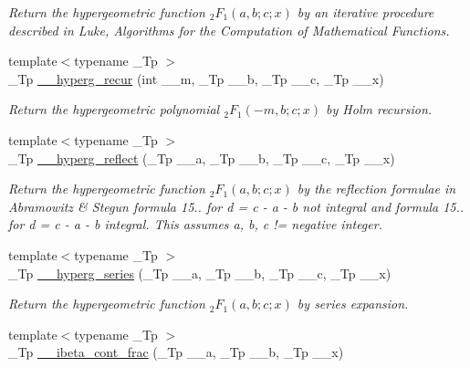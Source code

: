\begin{DoxyCompactItemize}
\begin{DoxyCompactList}\small\item\em Return the hypergeometric function $ {}_2F_1(a,b;c;x) $ by an iterative procedure described in Luke, Algorithms for the Computation of Mathematical Functions. \end{DoxyCompactList}\item 
{\footnotesize template$<$typename \+\_\+\+Tp $>$ }\\\+\_\+\+Tp \hyperlink{namespacestd_1_1____detail_a945aec89969c51a4778c63eba8741fab}{\+\_\+\+\_\+hyperg\+\_\+recur} (int \+\_\+\+\_\+m, \+\_\+\+Tp \+\_\+\+\_\+b, \+\_\+\+Tp \+\_\+\+\_\+c, \+\_\+\+Tp \+\_\+\+\_\+x)
\begin{DoxyCompactList}\small\item\em Return the hypergeometric polynomial $ {}_2F_1(-m,b;c;x) $ by Holm recursion. \end{DoxyCompactList}\item 
{\footnotesize template$<$typename \+\_\+\+Tp $>$ }\\\+\_\+\+Tp \hyperlink{namespacestd_1_1____detail_a3c3baddc93bfaf1cb368d4b74e53542d}{\+\_\+\+\_\+hyperg\+\_\+reflect} (\+\_\+\+Tp \+\_\+\+\_\+a, \+\_\+\+Tp \+\_\+\+\_\+b, \+\_\+\+Tp \+\_\+\+\_\+c, \+\_\+\+Tp \+\_\+\+\_\+x)
\begin{DoxyCompactList}\small\item\em Return the hypergeometric function $ {}_2F_1(a,b;c;x) $ by the reflection formulae in Abramowitz \& Stegun formula 15.. for d = c -\/ a -\/ b not integral and formula 15.. for d = c -\/ a -\/ b integral. This assumes a, b, c != negative integer. \end{DoxyCompactList}\item 
{\footnotesize template$<$typename \+\_\+\+Tp $>$ }\\\+\_\+\+Tp \hyperlink{namespacestd_1_1____detail_ad234e0d31f55cd3748169dccb2533c6a}{\+\_\+\+\_\+hyperg\+\_\+series} (\+\_\+\+Tp \+\_\+\+\_\+a, \+\_\+\+Tp \+\_\+\+\_\+b, \+\_\+\+Tp \+\_\+\+\_\+c, \+\_\+\+Tp \+\_\+\+\_\+x)
\begin{DoxyCompactList}\small\item\em Return the hypergeometric function $ {}_2F_1(a,b;c;x) $ by series expansion. \end{DoxyCompactList}\item 
{\footnotesize template$<$typename \+\_\+\+Tp $>$ }\\\+\_\+\+Tp \hyperlink{namespacestd_1_1____detail_a96a5a5205553de07f98b89b2e1f18000}{\+\_\+\+\_\+ibeta\+\_\+cont\+\_\+frac} (\+\_\+\+Tp \+\_\+\+\_\+a, \+\_\+\+Tp \+\_\+\+\_\+b, \+\_\+\+Tp \+\_\+\+\_\+x)

\end{DoxyCompactItemize}
